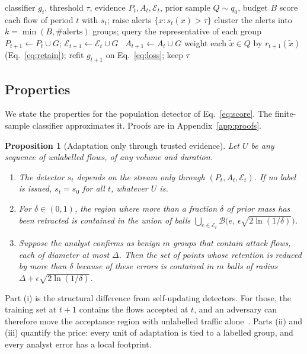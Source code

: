 \documentclass[preprint,12pt]{elsarticle}
\newtheorem{proposition}{Proposition}
\newcommand{\E}{\mathcal{E}}
\begin{document}
\begin{algorithm}[t]
\caption{ERNP, one period $t$}\label{alg:ernp}
\begin{algorithmic}[1]
\Require classifier $g_t$, threshold $\tau$, evidence $P_t,A_t,\E_t$, prior sample $Q\sim q_0$, budget $B$
\State score each flow of period $t$ with $s_t$; raise alerts $\{x: s_t(x)>\tau\}$ 
\State cluster the alerts into $k=\min(B,\#\text{alerts})$ groups; query the representative of each group
   $P_{t+1}\gets P_t\cup G$;\; $\E_{t+1}\gets\E_t\cup G$
  \Else\ $A_{t+1}\gets A_t\cup G$
  \EndIf
\EndFor
\State weight each $\tilde x\in Q$ by $r_{t+1}(\tilde x)$ (Eq.~\ref{eq:retain}); refit $g_{t+1}$ on Eq.~\eqref{eq:loss}; keep $\tau$
\end{algorithmic}
\end{algorithm}

\subsection{Properties}\label{sec:properties}
We state the properties for the population detector of Eq.~\eqref{eq:score}. The finite-sample classifier approximates it. Proofs are in Appendix~\ref{app:proofs}.

\begin{proposition}[Adaptation only through trusted evidence]\label{prop:p1}
Let $U$ be any sequence of unlabelled flows, of any volume and duration.
\begin{enumerate}
\item[(i)] The detector $s_t$ depends on the stream only through $(P_t,A_t,\E_t)$. If no label is issued, $s_t=s_0$ for all $t$, whatever $U$ is.
\item[(ii)] For $\delta\in(0,1)$, the region where more than a fraction $\delta$ of prior mass has been retracted is contained in the union of balls $\bigcup_{e\in\E_t}\mathcal B\big(e,\,\epsilon\sqrt{2\ln(1/\delta)}\big)$.
\item[(iii)] Suppose the analyst confirms as benign $m$ groups that contain attack flows, each of diameter at most $\Delta$. Then the set of points whose retention is reduced by more than $\delta$ \emph{because of these errors} is contained in $m$ balls of radius $\Delta+\epsilon\sqrt{2\ln(1/\delta)}$.
\end{enumerate}
\end{proposition}

Part (i) is the structural difference from self-updating detectors. For those, the training set at $t+1$ contains the flows accepted at $t$, and an adversary can therefore move the acceptance region with unlabelled traffic alone~\cite{kloft2012security}. Parts (ii) and (iii) quantify the price: every unit of adaptation is tied to a labelled group, and every analyst error has a local footprint.
\end{document}
